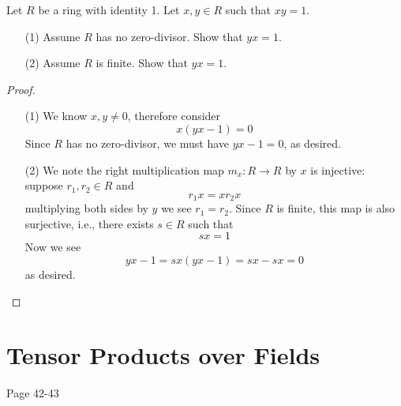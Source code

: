 \begin{prob}[S2006-Q2]
    Let \(R\) be a ring with identity 1. Let \(x, y \in R\) such that \(xy = 1\).
    \begin{itemize}
        \item[(1)] Assume \(R\) has no zero-divisor. Show that \(yx = 1\).
        \item[(2)] Assume \(R\) is finite. Show that \(yx = 1\).
    \end{itemize}
\end{prob}
\begin{proof}
    \begin{itemize}
        \item[(1)] We know $x,y\neq 0$, therefore consider 
        \begin{equation*}
            x(yx-1)=0
        \end{equation*}
        Since $R$ has no zero-divisor, we must have $yx-1=0$, as desired.
        \item[(2)] We note the right multiplication map $m_x:R\to R$ by $x$ is injective: suppose $r_1,r_2\in R$ and 
        \begin{equation*}
            r_1x=xr_2x
        \end{equation*}
        multiplying both sides by $y$ we see $r_1=r_2$. Since $R$ is finite, this map is also surjective, i.e., there exists $s\in R$ such that 
        \begin{equation*}
            sx=1
        \end{equation*} 
        Now we see 
        \begin{equation*}
            yx-1=sx(yx-1)=sx-sx=0
        \end{equation*}
        as desired.
    \end{itemize}
\end{proof}


























\chapter{Tensor Products over Fields}
Page 42-43

